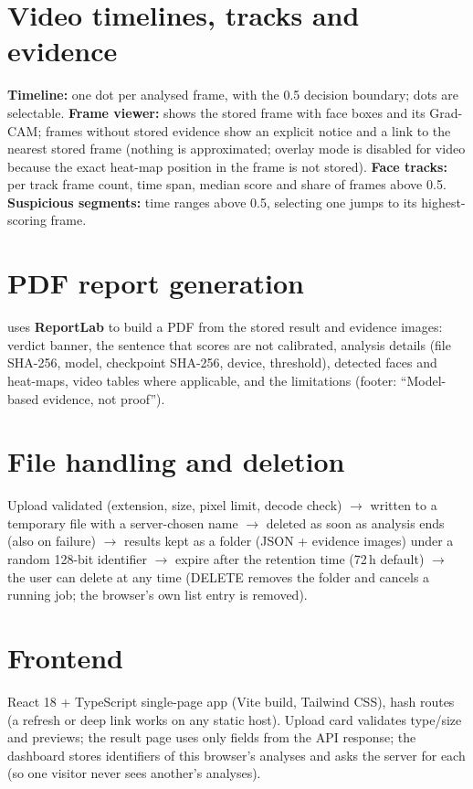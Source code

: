 \documentclass[11pt,a4paper]{report}
\newcommand{\code}[1]{\texttt{\detokenize{#1}}}
\begin{document}
\section{Video timelines, tracks and evidence}
\textbf{Timeline:} one dot per analysed frame, with the 0.5 decision boundary; dots are selectable. \textbf{Frame viewer:} shows the stored frame with face boxes and its Grad-CAM; frames without stored evidence show an explicit notice and a link to the nearest stored frame (nothing is approximated; overlay mode is disabled for video because the exact heat-map position in the frame is not stored). \textbf{Face tracks:} per track frame count, time span, median score and share of frames above 0.5. \textbf{Suspicious segments:} time ranges above 0.5, selecting one jumps to its highest-scoring frame.

\section{PDF report generation}
\code{report.py} uses \textbf{ReportLab} to build a PDF from the stored result and evidence images: verdict banner, the sentence that scores are not calibrated, analysis details (file SHA-256, model, checkpoint SHA-256, device, threshold), detected faces and heat-maps, video tables where applicable, and the limitations (footer: ``Model-based evidence, not proof'').

\section{File handling and deletion}
Upload validated (extension, size, pixel limit, decode check) $\rightarrow$ written to a temporary file with a server-chosen name $\rightarrow$ deleted as soon as analysis ends (also on failure) $\rightarrow$ results kept as a folder (JSON + evidence images) under a random 128-bit identifier $\rightarrow$ expire after the retention time (72\,h default) $\rightarrow$ the user can delete at any time (DELETE removes the folder and cancels a running job; the browser's own list entry is removed).

\section{Frontend}
React 18 + TypeScript single-page app (Vite build, Tailwind CSS), hash routes (a refresh or deep link works on any static host). Upload card validates type/size and previews; the result page uses only fields from the API response; the dashboard stores identifiers of this browser's analyses and asks the server for each (so one visitor never sees another's analyses).
\end{document}

